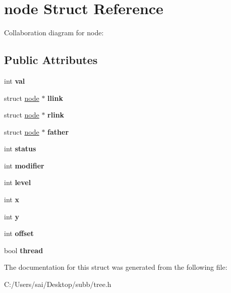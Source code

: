 \hypertarget{structnode}{}\section{node Struct Reference}
\label{structnode}


Collaboration diagram for node\+:
\subsection*{Public Attributes}
\begin{DoxyCompactItemize}
\item 
\mbox{\label{structnode_a707bf3f1eeeaf8974e7e8e90f7bfd6a1}} 
int {\bfseries val}
\item 
\mbox{\label{structnode_ab7d476c75161e9cff281b1dfc68d47f5}} 
struct \mbox{\hyperlink{structnode}{node}} $\ast$ {\bfseries llink}
\item 
\mbox{\label{structnode_aae0b36108e68e7e9cd58624517620f46}} 
struct \mbox{\hyperlink{structnode}{node}} $\ast$ {\bfseries rlink}
\item 
\mbox{\label{structnode_a228f2eea8ff7ca1d0719838a85e6ac4f}} 
struct \mbox{\hyperlink{structnode}{node}} $\ast$ {\bfseries father}
\item 
\mbox{\label{structnode_aa6f53328245adaec3cc9d3e10697f7b7}} 
int {\bfseries status}
\item 
\mbox{\label{structnode_a0bc9b9b4196232b7ea74cb9b9d9be481}} 
int {\bfseries modifier}
\item 
\mbox{\label{structnode_a3871d43e823ba9542b052912d01709dd}} 
int {\bfseries level}
\item 
\mbox{\label{structnode_a64dd8b65a7d38c632a017d7f36444dbb}} 
int {\bfseries x}
\item 
\mbox{\label{structnode_ae944a3a75efb9856fa5c6f2221e2b49e}} 
int {\bfseries y}
\item 
\mbox{\label{structnode_aeef7855fea382bfb671d7834aefa4b22}} 
int {\bfseries offset}
\item 
\mbox{\label{structnode_afd9ff5fa3c3ab99d07cac2a7ad9d14a6}} 
bool {\bfseries thread}
\end{DoxyCompactItemize}


The documentation for this struct was generated from the following file\+:\begin{DoxyCompactItemize}
\item 
C\+:/\+Users/sai/\+Desktop/subb/tree.\+h\end{DoxyCompactItemize}
